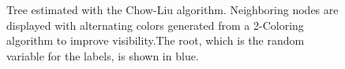 \begin{figure}[!htb]
        \caption[Approximated independence structure of the Covertype data set]{Tree estimated with the Chow-Liu algorithm. Neighboring nodes are displayed with alternating colors generated from a 2-Coloring algorithm to improve visibility.The root, which is the random variable for the labels, is shown in blue.}
        \label{fig:covertype_ind}
\end{figure}